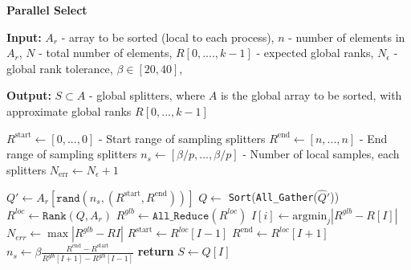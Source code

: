 \begin{algorithm}
    \caption{\textbf{Parallel Select}}
    \begin{algorithmic}
        \STATE \textbf{Input:} $A_r$ - array to be sorted (local to each process), $n$ - number of elements in $A_r$, $N$ - total number of elements, $R[0,....,k-1]$ - expected global ranks, $N_\epsilon$ - global rank tolerance, $\beta \in [20, 40]$,

        \STATE \textbf{Output:} $S \subset A$ - global splitters, where $A$ is the global array to be sorted, with approximate global ranks $R[0,...,k-1]$

        \STATE $R^{\text{start}} \gets [0,...,0]$ - Start range of sampling splitters
        \STATE $R^{\text{end}} \gets [n,...,n]$ - End range of sampling splitters
        \STATE $n_s \gets [\beta/p,...,\beta/p]$ - Number of local samples, each splitters
        \STATE $N_{\text{err}} \gets N_\epsilon + 1$

            \STATE $Q' \gets A_r[\texttt{rand}(n_s, (R^{\text{start}}, R^{\text{end}}))]$
            \STATE $Q \gets$ \texttt{Sort}(\texttt{All\_Gather}($\hat{Q}'$)) 
            \STATE $R^{loc} \gets \texttt{Rank}(Q, A_r)$
            \STATE $R^{glb} \gets \texttt{All\_Reduce}(R^{loc})$
            \STATE $ I[i] \gets \text{argmin}_j | R^{glb} - R[I] | $ 
            \STATE $N_{err} \gets \max |R^{glb} - R{I}|$
            \STATE $R^{\text{start}} \gets R^{loc}[I-1]$
            \STATE $R^{\text{end}}  \gets R^{loc}[I+1]$
            \STATE $n_s \gets \beta \frac{R^{\text{end}}-R^{\text{start}}}{R^{glb}[I+1]-R^{glb}[I-1]}$
        \ENDWHILE
        \STATE \textbf{return }$S \gets Q[I]$
    \end{algorithmic}
\end{algorithm}

